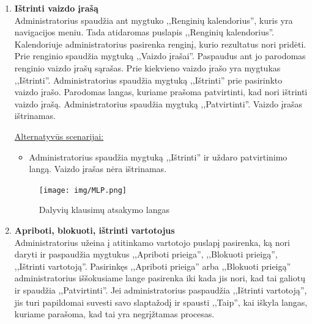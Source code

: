 \documentclass{VUMIFPSkursinis}
\begin{document}
\begin{enumerate} [label = \textbf{U\arabic*.}]
					\underline{Alternatyvūs scenarijai:}
					\begin{itemize}
						\item Metama klaida, jei bandoma įkelti failą iš kompiuterio ir įvesti nuorodą.
						\item Metama klaida, jei bando talpinti netinkamo formato failą.
					\end{itemize}
				
				\begin{figure}[H]
					\centering
					\texttt{[image: img/MLP.png]}
					\caption{Dalyvių klausimų atsakymo langas}
					\label{fig:atsakyti-klausimus}
				\end{figure}
					
			\item \textbf{Ištrinti vaizdo įrašą}   \\
					Administratorius spaudžia ant mygtuko ,,Renginių kalendorius'', kuris yra navigacijos meniu. Tada atidaromas puslapis ,,Renginių kalendorius''. Kalendoriuje administratorius pasirenka renginį, kurio rezultatus nori pridėti. Prie renginio spaudžia mygtuką ,,Vaizdo įrašai''. Paspaudus ant jo parodomas renginio vaizdo įrašų sąrašas. Prie kiekvieno vaizdo įrašo yra mygtukas ,,Ištrinti''. Administratorius spaudžia mygtuką ,,Ištrinti'' prie pasirinkto vaizdo įrašo. Parodomas langas, kuriame prašoma patvirtinti, kad nori ištrinti vaizdo įrašą. Administratorius spaudžia mygtuką ,,Patvirtinti''. Vaizdo įrašas ištrinamas.
					
					\underline{Alternatyvūs scenarijai:}
					\begin{itemize}
						\item Administratorius spaudžia mygtuką ,,Ištrinti'' ir uždaro patvirtinimo langą. Vaizdo įrašas nėra ištrinamas.
					\end{itemize}
				
				\begin{figure}[H]
					\centering
					\texttt{[image: img/MLP.png]}
					\caption{Dalyvių klausimų atsakymo langas}
					\label{fig:atsakyti-klausimus}
				\end{figure}
					
			\item \textbf{Apriboti, blokuoti, ištrinti vartotojus}   \\
					Administratorius užeina į atitinkamo vartotojo puslapį pasirenka, ką nori daryti ir paspaudžia mygtukus ,,Apriboti prieiga'', ,,Blokuoti prieigą'', ,,Ištrinti vartotoją''. Pasirinkęs ,,Apriboti prieiga'' arba ,,Blokuoti prieigą'' administratorius iššokusiame lange pasirenka iki kada jis nori, kad tai galiotų ir spaudžia ,,Patvirtinti''. Jei administratorius paspaudžia ,,Ištrinti vartotoją'', jis turi papildomai suvesti savo slaptažodį ir spausti ,,Taip'', kai iškyla langas, kuriame parašoma, kad tai yra negrįžtamas procesas.
					

\end{enumerate}
\end{document}
